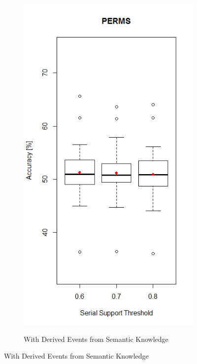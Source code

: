 \begin{figure}
\centering
\begin{subfigure}{.5\textwidth}
  \centering
  \includegraphics[width=\linewidth]{permsSupportSerialWithSemantic}
  \label{fig_permsSupportSerialWithSemantic}
  \caption{With Derived Events from Semantic Knowledge}
\end{subfigure}%

\end{figure}
